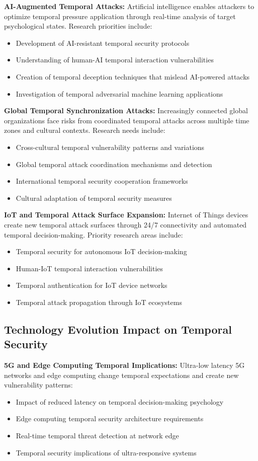 \documentclass[11pt,a4paper]{article}
\begin{document}
\textbf{AI-Augmented Temporal Attacks:} Artificial intelligence enables attackers to optimize temporal pressure application through real-time analysis of target psychological states. Research priorities include:
\begin{itemize}
\item Development of AI-resistant temporal security protocols
\item Understanding of human-AI temporal interaction vulnerabilities
\item Creation of temporal deception techniques that mislead AI-powered attacks
\item Investigation of temporal adversarial machine learning applications
\end{itemize}

\textbf{Global Temporal Synchronization Attacks:} Increasingly connected global organizations face risks from coordinated temporal attacks across multiple time zones and cultural contexts. Research needs include:
\begin{itemize}
\item Cross-cultural temporal vulnerability patterns and variations
\item Global temporal attack coordination mechanisms and detection
\item International temporal security cooperation frameworks
\item Cultural adaptation of temporal security measures
\end{itemize}

\textbf{IoT and Temporal Attack Surface Expansion:} Internet of Things devices create new temporal attack surfaces through 24/7 connectivity and automated temporal decision-making. Priority research areas include:
\begin{itemize}
\item Temporal security for autonomous IoT decision-making
\item Human-IoT temporal interaction vulnerabilities
\item Temporal authentication for IoT device networks
\item Temporal attack propagation through IoT ecosystems
\end{itemize}

\subsection{Technology Evolution Impact on Temporal Security}

\textbf{5G and Edge Computing Temporal Implications:} Ultra-low latency 5G networks and edge computing change temporal expectations and create new vulnerability patterns:
\begin{itemize}
\item Impact of reduced latency on temporal decision-making psychology
\item Edge computing temporal security architecture requirements
\item Real-time temporal threat detection at network edge
\item Temporal security implications of ultra-responsive systems
\end{itemize}
\end{document}
